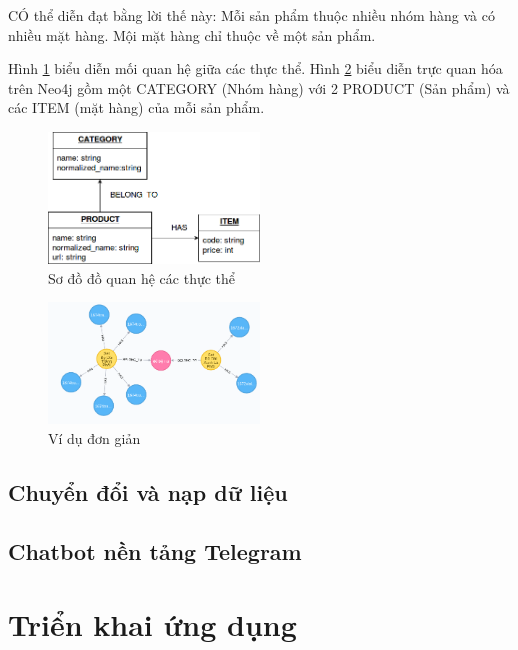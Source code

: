 CÓ thể diễn đạt bằng lời thế này: Mỗi sản phẩm thuộc nhiều nhóm hàng và có nhiều mặt hàng. Mội mặt hàng chỉ thuộc về một sản phẩm. 

Hình \ref{fig:datastructure} biểu diễn mối quan hệ giữa các thực thể. Hình \ref{fig:datastructureexample} biểu diễn trực quan hóa trên Neo4j gồm một CATEGORY (Nhóm hàng) với 2 PRODUCT (Sản phẩm) và các ITEM (mặt hàng) của mỗi sản phẩm.  

\begin{figure}[h]
\centering
\includegraphics[width=0.5\textwidth]{image/neo4jdatastructure.png}
\caption{\label{fig:datastructure} Sơ đồ đồ quan hệ các thực thể}
\end{figure}


\begin{figure}[h]
\centering
\includegraphics[width=0.5\textwidth]{imagev2/vddatamodel.png}
\caption{\label{fig:datastructureexample} Ví dụ đơn giản}
\end{figure}


\subsection{Chuyển đổi và nạp dữ liệu}



\subsection{Chatbot nền tảng Telegram}

\section{Triển khai ứng dụng}

